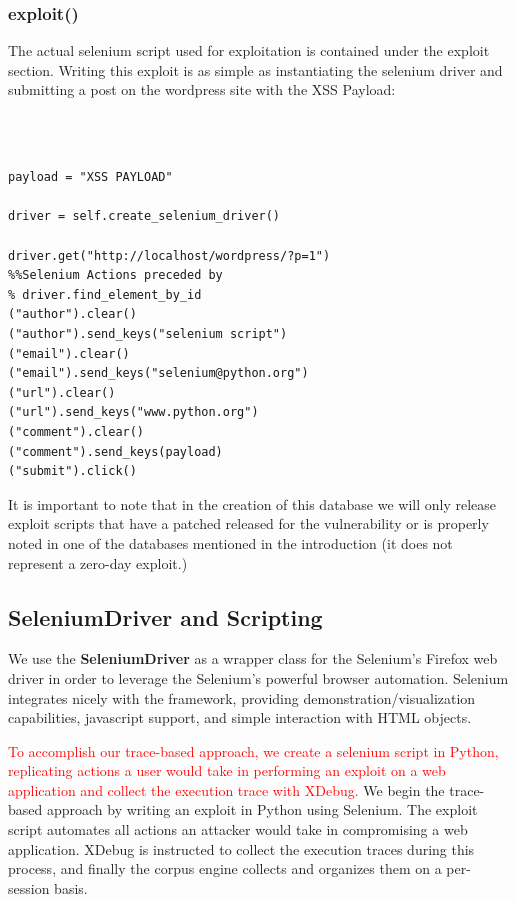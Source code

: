 \documentclass[letterpaper,twocolumn,10pt]{article}
\begin{document}
\subsubsection{exploit()}

The actual selenium script used for exploitation is contained under the exploit section.  Writing this exploit is as simple as instantiating the selenium driver and submitting a post on the wordpress site with the XSS Payload: 

{\tt \footnotesize
\begin{verbatim}

payload = "XSS PAYLOAD"

driver = self.create_selenium_driver()

driver.get("http://localhost/wordpress/?p=1")
%%Selenium Actions preceded by
% driver.find_element_by_id
("author").clear()
("author").send_keys("selenium script")
("email").clear()
("email").send_keys("selenium@python.org")
("url").clear()
("url").send_keys("www.python.org")
("comment").clear()
("comment").send_keys(payload)
("submit").click()

\end{verbatim}
}

It is important to note that in the creation of this database we will only release exploit scripts that have a patched released for the vulnerability or is properly noted in one of the databases mentioned in the introduction (it does not represent a zero-day exploit.)


\subsection{{\bf SeleniumDriver} and Scripting}
We use the {\bf SeleniumDriver} as a wrapper class for the Selenium's Firefox web driver in order to leverage the Selenium's powerful browser automation.  Selenium integrates nicely with the framework, providing demonstration/visualization capabilities, javascript support, and simple interaction with HTML objects.

\textcolor{red}{To accomplish our trace-based approach, we create a selenium script in Python, replicating actions a user would take in performing an exploit on a web application and collect the execution trace with XDebug.}
We begin the trace-based approach by writing an exploit in Python using Selenium. The exploit script automates all actions an attacker would take in compromising a web application. XDebug is instructed to collect the execution traces during this process, and finally the corpus engine collects and organizes them on a per-session basis.
\end{document}
